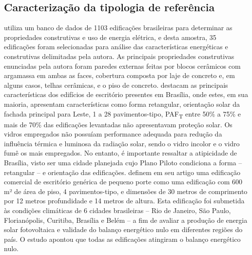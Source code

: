 \subsection{Caracterização da tipologia de referência}
\textcite{Didone2014} utiliza um banco de dados de 1103 edificações brasileiras para determinar as propriedades construtivas e uso de energia elétrica, e desta amostra, 35 edificações foram selecionadas para análise das características energéticas e construtivas delimitadas pela autora. As principais propriedades construtivas enunciadas pela autora foram paredes externas feitas por blocos cerâmicos com argamassa em ambas as faces, cobertura composta por laje de concreto e, em alguns casos, telhas cerâmicas, e o piso de concreto.\vspace*{0.3cm}\newline
\textcite{Costa2017} destacam as principais características dos edifícios de escritório presentes em Brasília, onde estes, em sua maioria, apresentam características como forma retangular, orientação solar da fachada principal para Leste, 1 a 28 pavimentos-tipo, PAF\textsubscript{T} entre 50\% a 75\% e mais de 70\% das edificações levantadas não apresentavam proteção solar. Os vidros empregados não possuíam performance adequada para redução da influência térmica e luminosa da radiação solar, sendo o vidro incolor e o vidro fumê os mais empregados. No entanto, é importante ressaltar a atipicidade de Brasília, visto ser uma cidade planejada cujo Plano Piloto condiciona a forma – retangular – e orientação das edificações.\vspace*{0.3cm}\newline
\textcite{Sorgato2018} definem em seu artigo uma edificação comercial de escritório genérica de pequeno porte como uma edificação com 600 m² de área de piso, 4 pavimentos-tipo, e dimensões de 30 metros de comprimento por 12 metros profundidade e 14 metros de altura. Esta edificação foi submetida às condições climáticas de 6 cidades brasileiras – Rio de Janeiro, São Paulo, Florianópolis, Curitiba, Brasília e Belém – a fim de avaliar a produção de energia solar fotovoltaica e validade do balanço energético nulo em diferentes regiões do país. O estudo apontou que todas as edificações atingiram o balanço energético nulo.\vspace*{0.3cm}\newline
